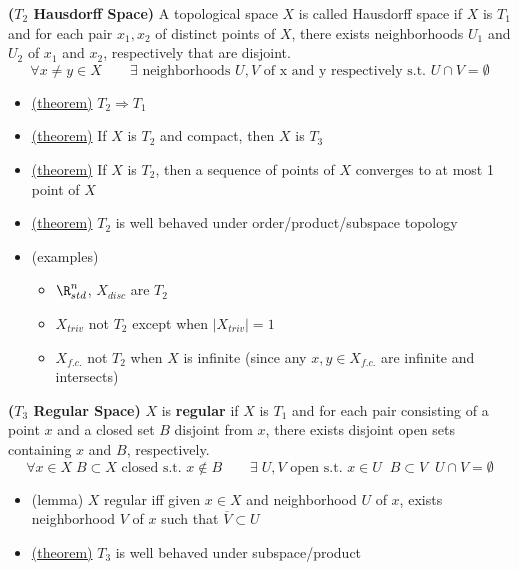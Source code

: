 \documentclass[10.5pt]{article}
\begin{document}
\begin{defn*}
    \textbf{($T_2$ Hausdorff Space)} 
    A topological space $X$ is called Hausdorff space if $X$ is $T_1$ and for each pair $x_1,x_2$ of distinct points of $X$, there exists neighborhoods $U_1$ and $U_2$ of $x_1$ and $x_2$, respectively that are disjoint.
    \[
        \forall x \neq y \in X \qquad \exists \text{ neighborhoods } U, V \text{ of x and y respectively}  \text{ s.t. } U\cap V = \emptyset
    \]
    \begin{itemize}
        \item \underline{(theorem)} $T_2 \Rightarrow T_1$
        \item \underline{(theorem)} If $X$ is $T_2$ and compact, then $X$ is $T_3$
        \item \underline{(theorem)} If $X$ is $T_2$, then a sequence of points of $X$ converges to at most 1 point of $X$
        \item \underline{(theorem)} $T_2$ is well behaved under order/product/subspace topology
        \item (examples)
        \begin{itemize}
            \item $\R^n_{std}$, $X_{disc}$ are $T_2$
            \item $X_{triv}$ not $T_2$ except when $|X_{triv}| =1$
            \item $X_{f.c.}$ not $T_2$ when $X$ is infinite (since any $x,y\in X_{f.c.}$ are infinite and intersects)
        \end{itemize}
    \end{itemize}
\end{defn*}


\begin{defn*}
    \textbf{($T_3$ Regular Space)} $X$ is \textbf{regular} if $X$ is $T_1$ and for each pair consisting of a point $x$ and a closed set $B$ disjoint from $x$, there exists disjoint open sets containing $x$ and $B$, respectively.
    \[
        \forall x\in X \; B \subset X \text{ closed s.t. } x\not\in B \qquad \exists\; U,V \text{ open s.t. } x\in U \;\; B\subset V \;\; U\cap V = \emptyset
    \]
    \begin{itemize}
        \item (lemma) $X$ regular iff given $x\in X$ and neighborhood $U$ of $x$, exists neighborhood $V$ of $x$ such that $\overline{V} \subset U$
        \item \underline{(theorem)} $T_3$ is well behaved under subspace/product 
    \end{itemize}
 \end{defn*}
\end{document}
